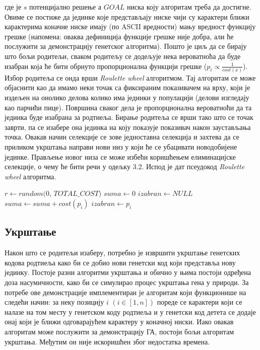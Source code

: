 \documentclass{article}
\begin{document}
где је $s$ потенцијално решење а $GOAL$ ниска коју алгоритам треба да достигне. Овиме се постиже да 
јединке које представљају ниске чији су карактери ближи карактерима коначне ниске имају (по ASCII вредности) 
мању вредност функцију грешке (напомена: оваква дефиниција функције грешке није 
добра, али ће послужити за демонстрацију генетског алгоритма). Пошто
је циљ да се бирају што бољи родитељи, сваком родитељу се додељује нека вероватноћа да буде изабран
која ће бити обрнуто пропорционална функцији грешке ($p_i \propto \frac{1}{cost(x)}$).
Избор родитеља се онда врши \textit{Roulette wheel} алгоритмом. Тај алгоритам се може објаснити као
да имамо неки точак са фиксираним показивачем на врху, који је издељен на онолико делова колико има јединки у популацији
(делови изгледају као парчићи пице). Површина сваког дела је пропорционална вероватноћи да 
та јединка буде изабрана за родтиеља. Бирање родитеља се врши тако што се точак заврти, па 
се изабере она јединка на коју показује показивач након заустављања точка. Овакав начин селекције
се зове једноставна селекција и захтева да се приликом укрштања направи нови низ у који ће се убацивати
новодобијене јединке. Прављење новог низа се може избећи коришћењем елиминацијске селекције, о чему ће бити
речи у одељку 3.2. Испод је дат псеудокод \textit{Roulette wheel} алгоритма.
\newline
\begin{algorithmic}
\State $r \gets random(0$, $TOTAL\_COST)$
\State $suma \gets 0$
\State $izabran \gets NULL$
    \State $suma \gets suma + cost(p_i)$
        \State $izabran \gets p_i$
    \EndIf
\EndFor
\end{algorithmic}


\subsection{Укрштање}
Након што се родитељи изаберу, потребно је извршити укрштање генетских кодова родтиеља
како би се добио нови генетски код који представља нову јединку. Постоје разни алгоритми укрштања
и обично у њима постоји одређена доза насумичности, како би се симулирао процес укрштања гена у природи.
За потребе ове демонстрације имплементиран је алгоритам који функционише на следећи начин: 
за неку позицију $i$ $(i \in [1, n])$ пореде се карактери који се налазе на том месту у генетском коду родтиеља
и у генетски код детета се додаје онај који је ближи одговарајућем карактеру у коначној ниски. 
Иако овакав алгоритам може послужити за демонстрацију ГА, постоји бољи алгоритам укрштања. 
Међутим он није искоришћен због недостатка времена.
\end{document}
